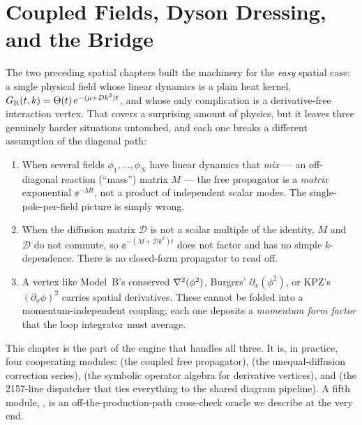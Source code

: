 \chapter{Coupled Fields, Dyson Dressing, and the Bridge}\label{ch:spatial-coupled}

The two preceding spatial chapters built the machinery for the \emph{easy}
spatial case: a single physical field whose linear dynamics is a plain heat
kernel, $G_{\mathrm R}(t,k)=\Theta(t)\,\mathrm{e}^{-(\mu+Dk^{2})t}$, and whose only
complication is a derivative-free interaction vertex. That covers a surprising
amount of physics, but it leaves three genuinely harder situations untouched,
and each one breaks a different assumption of the diagonal path:

\begin{enumerate}
  \item {} When several fields
        $\phi_{1},\dots,\phi_{N}$ have linear dynamics that \emph{mix} --- an
        off-diagonal reaction (``mass'') matrix $M$ --- the free propagator is a
        \emph{matrix} exponential $\ee^{-Mt}$, not a product of independent
        scalar modes. The single-pole-per-field picture is simply wrong.
  \item {} When the diffusion matrix $\mathcal{D}$ is not
        a scalar multiple of the identity, $M$ and $\mathcal{D}$ do not commute,
        so $\ee^{-(M+\mathcal{D}k^{2})t}$ does not factor and has no simple
        $k$-dependence. There is no closed-form propagator to read off.
  \item {} A vertex like Model~B's conserved
        $\nabla^2(\phi^{2})$, Burgers' $\partial_{x}(\phi^{2})$, or KPZ's
        $(\partial_{x}\phi)^{2}$ carries spatial derivatives. These cannot be
        folded into a momentum-independent coupling; each one deposits a
        \emph{momentum form factor} that the loop integrator must average.
\end{enumerate}

This chapter is the part of the engine that handles all three. It is, in
practice, four cooperating modules:
 (the coupled free propagator),
 (the unequal-diffusion correction series),
 (the symbolic operator algebra for derivative
vertices), and  (the 2157-line dispatcher that ties
everything to the shared diagram pipeline). A fifth module,
, is an off-the-production-path cross-check oracle we
describe at the very end.

